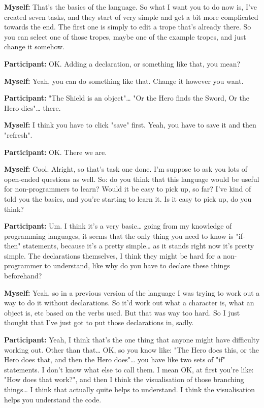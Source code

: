 \documentclass[11pt]{report}
\begin{document}
\begin{linenumbers}
\textbf{Myself:} That's the basics of the language. So what I want you to do now is, I've created seven tasks, and they start of very simple and get a bit more complicated towards the end. The first one is simply to edit a trope that's already there. So you can select one of those tropes, maybe one of the example tropes, and just change it somehow.

\textbf{Participant:} OK. Adding a declaration, or something like that, you mean?

\textbf{Myself:} Yeah, you can do something like that. Change it however you want.

\textbf{Participant:} "The Shield is an object"\ldots{} "Or the Hero finds the Sword, Or the Hero dies"\ldots{} there.

\textbf{Myself:} I think you have to click "save" first. Yeah, you have to save it and then "refresh".

\textbf{Participant:} OK. There we are.

\textbf{Myself:} Cool. Alright, so that's task one done. I'm suppose to ask you lots of open-ended questions as well. So: do you think that this language would be useful for non-programmers to learn? Would it be easy to pick up, so far? I've kind of told you the basics, and you're starting to learn it. Is it easy to pick up, do you think?

\textbf{Participant:} Um. I think it's a very basic\ldots{} going from my
knowledge of programming languages, it seems that the only thing you need to
know is "if-then" statements, because it's a pretty simple\ldots{} as it stands
right now it's pretty simple. The declarations themselves, I think they might be
hard for a non-programmer to understand, like why do you have to declare these
things beforehand?

\textbf{Myself:} Yeah, so in a previous version of the language I was trying to work out a way to do it without declarations. So it'd work out what a character is, what an object is, etc based on the verbs used. But that was way too hard. So I just thought that I've just got to put those declarations in, sadly.

\textbf{Participant:} Yeah, I think that's the one thing that anyone might have difficulty working out. Other than that\ldots{} OK, so you know like: "The Hero does this, or the Hero does that, and then the Hero does"\ldots{} you have like two sets of "if" statements. I don't know what else to call them. I mean OK, at first you're like: "How does that work?", and then I think the visualisation of those branching things\ldots{} I think that actually quite helps to understand. I think the visualisation helps you understand the code.


\end{linenumbers}
\end{document}
